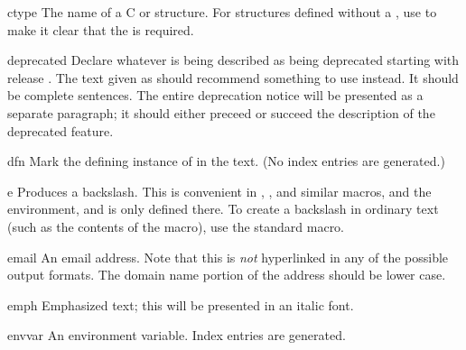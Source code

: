 \documentclass{howto}
\begin{document}
    \begin{macrodesc}{ctype}{}
      The name of a C  or structure.  For structures
      defined without a , use  to make it clear that the  is
      required.
    \end{macrodesc}

    \begin{macrodesc}{deprecated}{}
      Declare whatever is being described as being deprecated starting
      with release .  The text given as 
      should recommend something to use instead.  It should be
      complete sentences.  The entire deprecation notice will be
      presented as a separate paragraph; it should either preceed or
      succeed the description of the deprecated feature.
    \end{macrodesc}

    \begin{macrodesc}{dfn}{}
      Mark the defining instance of  in the text.  (No index
      entries are generated.)
    \end{macrodesc}

    \begin{macrodesc}{e}{}
      Produces a backslash.  This is convenient in ,
      , and similar macros, and the 
      environment, and is only defined there.  To
      create a backslash in ordinary text (such as the contents of the
       macro), use the standard 
      macro.
    \end{macrodesc}

    \begin{macrodesc}{email}{}
      An email address.  Note that this is \emph{not} hyperlinked in
      any of the possible output formats.  The domain name portion of
      the address should be lower case.
    \end{macrodesc}

    \begin{macrodesc}{emph}{}
      Emphasized text; this will be presented in an italic font.
    \end{macrodesc}

    \begin{macrodesc}{envvar}{}
      An environment variable.  Index entries are generated.
    \end{macrodesc}
\end{document}
